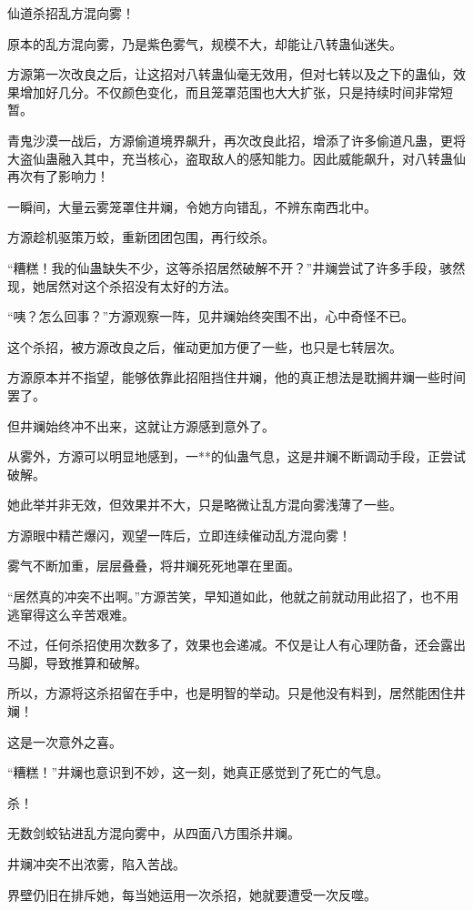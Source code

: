 \begin{this_body}
仙道杀招乱方混向雾！

原本的乱方混向雾，乃是紫色雾气，规模不大，却能让八转蛊仙迷失。

方源第一次改良之后，让这招对八转蛊仙毫无效用，但对七转以及之下的蛊仙，效果增加好几分。不仅颜色变化，而且笼罩范围也大大扩张，只是持续时间非常短暂。

青鬼沙漠一战后，方源偷道境界飙升，再次改良此招，增添了许多偷道凡蛊，更将大盗仙蛊融入其中，充当核心，盗取敌人的感知能力。因此威能飙升，对八转蛊仙再次有了影响力！

一瞬间，大量云雾笼罩住井斓，令她方向错乱，不辨东南西北中。

方源趁机驱策万蛟，重新团团包围，再行绞杀。

“糟糕！我的仙蛊缺失不少，这等杀招居然破解不开？”井斓尝试了许多手段，骇然现，她居然对这个杀招没有太好的方法。

“咦？怎么回事？”方源观察一阵，见井斓始终突围不出，心中奇怪不已。

这个杀招，被方源改良之后，催动更加方便了一些，也只是七转层次。

方源原本并不指望，能够依靠此招阻挡住井斓，他的真正想法是耽搁井斓一些时间罢了。

但井斓始终冲不出来，这就让方源感到意外了。

从雾外，方源可以明显地感到，一**的仙蛊气息，这是井斓不断调动手段，正尝试破解。

她此举并非无效，但效果并不大，只是略微让乱方混向雾浅薄了一些。

方源眼中精芒爆闪，观望一阵后，立即连续催动乱方混向雾！

雾气不断加重，层层叠叠，将井斓死死地罩在里面。

“居然真的冲突不出啊。”方源苦笑，早知道如此，他就之前就动用此招了，也不用逃窜得这么辛苦艰难。

不过，任何杀招使用次数多了，效果也会递减。不仅是让人有心理防备，还会露出马脚，导致推算和破解。

所以，方源将这杀招留在手中，也是明智的举动。只是他没有料到，居然能困住井斓！

这是一次意外之喜。

“糟糕！”井斓也意识到不妙，这一刻，她真正感觉到了死亡的气息。

杀！

无数剑蛟钻进乱方混向雾中，从四面八方围杀井斓。

井斓冲突不出浓雾，陷入苦战。

界壁仍旧在排斥她，每当她运用一次杀招，她就要遭受一次反噬。


\end{this_body}
